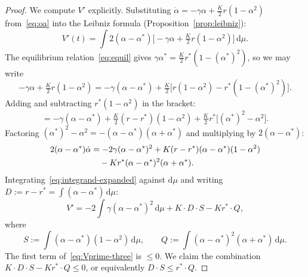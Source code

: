 \documentclass[11pt,a4paper]{article}
\theoremstyle{definition}
\begin{document}
\begin{proof}
We compute $V'$ explicitly. Substituting $\dot\alpha = -\gamma\alpha + \tfrac{K}{2}r(1-\alpha^2)$ from~\eqref{eq:oa} into the Leibniz formula (Proposition~\ref{prop:leibniz}):
\begin{equation}\label{eq:Vprime-raw}
V'(t) = \int 2(\alpha-\alpha^*)\bigl[-\gamma\alpha + \tfrac{K}{2}r(1-\alpha^2)\bigr]\,\mathrm{d}\mu.
\end{equation}
The equilibrium relation~\eqref{eq:equil} gives $\gamma\alpha^* = \tfrac{K}{2}r^*(1-(\alpha^*)^2)$, so we may write
\[
-\gamma\alpha + \tfrac{K}{2}r(1-\alpha^2) = -\gamma(\alpha-\alpha^*) + \tfrac{K}{2}\bigl[r(1-\alpha^2)-r^*(1-(\alpha^*)^2)\bigr].
\]
Adding and subtracting $r^*(1-\alpha^2)$ in the bracket:
\begin{equation}\label{eq:rhs-split}
= -\gamma(\alpha-\alpha^*) + \tfrac{K}{2}(r-r^*)(1-\alpha^2) + \tfrac{K}{2}r^*\bigl[(\alpha^*)^2-\alpha^2\bigr].
\end{equation}
Factoring $(\alpha^*)^2-\alpha^2 = -(\alpha-\alpha^*)(\alpha+\alpha^*)$ and multiplying by $2(\alpha-\alpha^*)$:
\begin{align}
2(\alpha-\alpha^*)\dot\alpha &= -2\gamma(\alpha-\alpha^*)^2 + K(r-r^*)(\alpha-\alpha^*)(1-\alpha^2) \notag\\
&\quad - Kr^*(\alpha-\alpha^*)^2(\alpha+\alpha^*). \label{eq:integrand-expanded}
\end{align}
Integrating~\eqref{eq:integrand-expanded} against $\mathrm{d}\mu$ and writing $D := r-r^* = \int(\alpha-\alpha^*)\,\mathrm{d}\mu$:
\begin{equation}\label{eq:Vprime-three}
V' = -2\int\gamma(\alpha-\alpha^*)^2\,\mathrm{d}\mu + K\cdot D\cdot S - K r^*\cdot Q,
\end{equation}
where
\[
S := \int(\alpha-\alpha^*)(1-\alpha^2)\,\mathrm{d}\mu, \qquad Q := \int(\alpha-\alpha^*)^2(\alpha+\alpha^*)\,\mathrm{d}\mu.
\]
The first term of~\eqref{eq:Vprime-three} is $\leq 0$. We claim the combination $K\cdot D\cdot S - Kr^*\cdot Q \leq 0$, or equivalently $D\cdot S \leq r^*\cdot Q$.


\end{proof}
\end{document}
